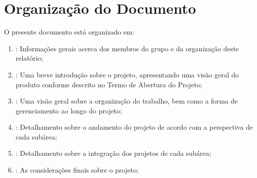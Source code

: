 	\section{Organização do Documento}
	\label{sec:apresentacao_organizacao}

		O presente documento está organizado em: 

		\begin{enumerate}
			\item{\textbf{}: Informações gerais acerca dos membros do grupo e da organização deste relatório;}
			\item{\textbf{}: Uma breve introdução sobre o projeto, apresentando uma visão geral do produto conforme descrito no Termo de Abertura do Projeto;}
			\item{\textbf{}: Uma visão geral sobre a organização do trabalho, bem como a forma de gerenciamento ao longo do projeto;}
			\item{\textbf{}: Detalhamento sobre o andamento do projeto de acordo com a perspectiva de cada subárea;}
			\item{\textbf{}: Detalhamento sobre a integração dos projetos de cada subárea;}
			\item{\textbf{}: As considerações finais sobre o projeto;}
		\end{enumerate}

